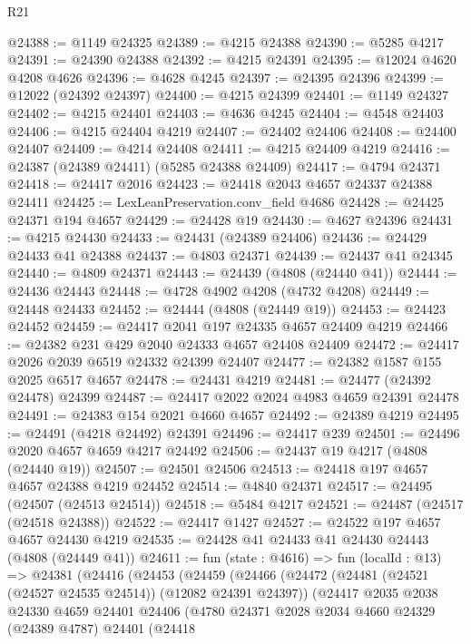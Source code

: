 \begin{lexlean}{R21}
\begin{coremodule}
@24388 := @1149 @24325
@24389 := @4215 @24388
@24390 := @5285 @4217
@24391 := @24390 @24388
@24392 := @4215 @24391
@24395 := @12024 @4620 @4208 @4626
@24396 := @4628 @4245
@24397 := @24395 @24396
@24399 := @12022 (@24392 @24397)
@24400 := @4215 @24399
@24401 := @1149 @24327
@24402 := @4215 @24401
@24403 := @4636 @4245
@24404 := @4548 @24403
@24406 := @4215 @24404 @4219
@24407 := @24402 @24406
@24408 := @24400 @24407
@24409 := @4214 @24408
@24411 := @4215 @24409 @4219
@24416 := @24387 (@24389 @24411) (@5285 @24388 @24409)
@24417 := @4794 @24371
@24418 := @24417 @2016
@24423 := @24418 @2043 @4657 @24337 @24388 @24411
@24425 := LexLeanPreservation.conv_field @4686
@24428 := @24425 @24371 @194 @4657
@24429 := @24428 @19
@24430 := @4627 @24396
@24431 := @4215 @24430
@24433 := @24431 (@24389 @24406)
@24436 := @24429 @24433 @41 @24388
@24437 := @4803 @24371
@24439 := @24437 @41 @24345
@24440 := @4809 @24371
@24443 := @24439 (@4808 (@24440 @41))
@24444 := @24436 @24443
@24448 := @4728 @4902 @4208 (@4732 @4208)
@24449 := @24448 @24433
@24452 := @24444 (@4808 (@24449 @19))
@24453 := @24423 @24452
@24459 := @24417 @2041 @197 @24335 @4657 @24409 @4219
@24466 := @24382 @231 @429 @2040 @24333 @4657 @24408 @24409
@24472 := @24417 @2026 @2039 @6519 @24332 @24399 @24407
@24477 := @24382 @1587 @155 @2025 @6517 @4657
@24478 := @24431 @4219
@24481 := @24477 (@24392 @24478) @24399
@24487 := @24417 @2022 @2024 @4983 @4659 @24391 @24478
@24491 := @24383 @154 @2021 @4660 @4657
@24492 := @24389 @4219
@24495 := @24491 (@4218 @24492) @24391
@24496 := @24417 @239
@24501 := @24496 @2020 @4657 @4659 @4217 @24492
@24506 := @24437 @19 @4217 (@4808 (@24440 @19))
@24507 := @24501 @24506
@24513 := @24418 @197 @4657 @4657 @24388 @4219 @24452
@24514 := @4840 @24371
@24517 := @24495 (@24507 (@24513 @24514))
@24518 := @5484 @4217
@24521 := @24487 (@24517 (@24518 @24388))
@24522 := @24417 @1427
@24527 := @24522 @197 @4657 @4657 @24430 @4219
@24535 := @24428 @41 @24433 @41 @24430 @24443 (@4808 (@24449 @41))
@24611 := fun (state : @4616) =>
  fun (localId : @13) =>
  @24381
    (@24416
      (@24453
        (@24459
          (@24466
            (@24472
              (@24481 (@24521 (@24527 @24535 @24514)) (@12082 @24391 @24397))
              (@24417
                @2035
                @2038
                @24330
                @4659
                @24401
                @24406
                (@4780
                  @24371
                  @2028
                  @2034
                  @4660
                  @24329
                  (@24389 @4787)
                  @24401
                  (@24418

\end{coremodule}
\end{lexlean}
